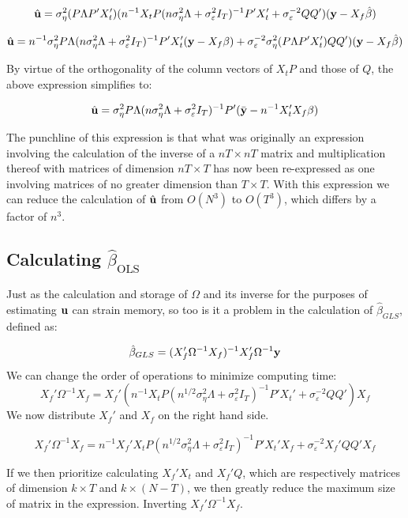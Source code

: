 $$ \hat{\mathbf{u}} = \sigma_\eta^2(P\Lambda P'X_t')(n^{-1} X_t P (n\sigma_\eta^2\Lambda + \sigma_\varepsilon^2I_T)^{-1}P'X_t' + \sigma_\varepsilon^{-2}Q
   Q')(\mathbf{y}-X_f\hat{\beta}) $$
   
$$ \hat{\mathbf{u}} = n^{-1}\sigma_\eta^2P\Lambda (n\sigma_\eta^2\Lambda + \sigma_\varepsilon^2I_T)^{-1}P'X_t'(\mathbf{y}-X_f\beta) + \sigma_\varepsilon^{-2}\sigma_\eta^2(P\Lambda P'X_t')Q
   Q')(\mathbf{y} - X_f\hat{\beta}) $$

By virtue of the orthogonality of the column vectors of $X_tP$ and those of $Q$, the above expression simplifies to:

$$ \hat{\mathbf{u}} = \sigma_\eta^2P\Lambda (n\sigma_\eta^2\Lambda + \sigma_\varepsilon^2I_T)^{-1}P'(\bar{\mathbf{y}} - n^{-1}X_t'X_f\beta) $$

The punchline of this expression is that what was originally an expression involving the calculation of the inverse of a $nT \times nT$ matrix and multiplication thereof with matrices of dimension $nT \times T$ has now been re-expressed as one involving matrices of no greater dimension than $T \times T$. With this expression we can reduce the calculation of $\hat{\mathbf{u}}$ from $O(N^3)$ to $O(T^3)$, which differs by a factor of $n^3$.

\subsection{Calculating $\hat{\beta}_\text{OLS}$}

Just as the calculation and storage of $\Omega$ and its inverse for the purposes of estimating $\mathbf{u}$ can strain memory, so too is it a problem in the calculation of $\hat{\beta}_{GLS}$, defined as: 

    $$\hat{\beta}_{GLS} = (X_f'\Omega^{-1}X_f)^{-1} X_f'\Omega^{-1}\mathbf{y}$$
We can change the order of operations to minimize computing time:
\begin{equation}
    X_f'\Omega^{-1}X_f = X_f' (n^{-1} X_t P (n^{1/2}\sigma_\eta^2\Lambda + \sigma_\varepsilon^2I_T)^{-1}P'X_t' + \sigma_\varepsilon^{-2}Q
   Q') X_f
\end{equation}
We now distribute $X_f'$ and $X_f$ on the right hand side.

\begin{equation}
    X_f'\Omega^{-1}X_f =  n^{-1}X_f' X_t P (n^{1/2}\sigma_\eta^2\Lambda + \sigma_\varepsilon^2I_T)^{-1}P'X_t'X_f + \sigma_\varepsilon^{-2} X_f'Q
   Q' X_f
\end{equation}

If we then prioritize calculating $X_f'X_t$ and $X_f'Q$, which are respectively matrices of dimension $k \times T$ and $k \times (N-T)$, we then greatly reduce the maximum size of matrix in the expression. Inverting $X_f'\Omega^{-1}X_f$. 


